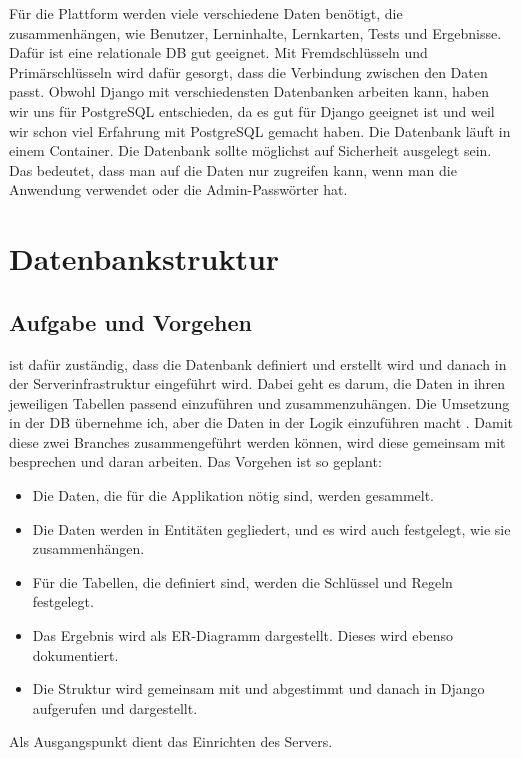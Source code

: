 Für die Plattform werden viele verschiedene Daten benötigt, die zusammenhängen, wie Benutzer, Lerninhalte, Lernkarten, Tests und Ergebnisse. Dafür ist eine relationale DB gut geeignet. Mit Fremdschlüsseln und Primärschlüsseln wird dafür gesorgt, dass die Verbindung zwischen den Daten passt. Obwohl Django mit verschiedensten Datenbanken arbeiten kann, haben wir uns für PostgreSQL entschieden, da es gut für Django geeignet ist und weil wir schon viel Erfahrung mit PostgreSQL gemacht haben. Die Datenbank läuft in einem Container. Die Datenbank sollte möglichst auf Sicherheit ausgelegt sein. Das bedeutet, dass man auf die Daten nur zugreifen kann, wenn man die Anwendung verwendet oder die Admin-Passwörter hat.
 
\section{Datenbankstruktur}
 
\subsection{Aufgabe und Vorgehen}
 
\Jai ist dafür zuständig, dass die Datenbank definiert und erstellt wird und danach in der Serverinfrastruktur eingeführt wird. Dabei geht es darum, die Daten in ihren jeweiligen Tabellen passend einzuführen und zusammenzuhängen. Die Umsetzung in der DB übernehme ich, aber die Daten in der Logik einzuführen macht \Luca. Damit diese zwei Branches zusammengeführt werden können, wird \Jai diese gemeinsam mit \Luca besprechen und daran arbeiten. Das Vorgehen ist so geplant:
 
\begin{itemize}
  \item Die Daten, die für die Applikation nötig sind, werden gesammelt.
  \item Die Daten werden in Entitäten gegliedert, und es wird auch festgelegt, wie sie zusammenhängen.
  \item Für die Tabellen, die definiert sind, werden die Schlüssel und Regeln festgelegt.
  \item Das Ergebnis wird als ER-Diagramm dargestellt. Dieses wird ebenso dokumentiert.
  \item Die Struktur wird gemeinsam mit \Luca und \Jakob abgestimmt und danach in Django aufgerufen und dargestellt.
\end{itemize}
 
Als Ausgangspunkt dient das Einrichten des Servers.
 
